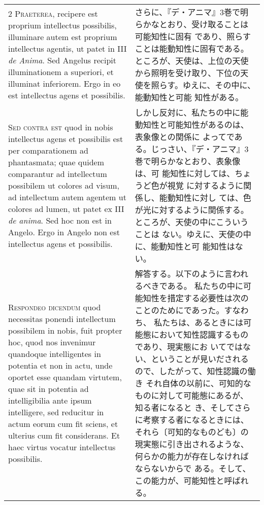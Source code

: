 \documentclass[10pt]{jsarticle} %
\begin{document}
\begin{longtable}{p{21em}p{21em}}
\\


2 {\scshape  Praeterea}, recipere est proprium
intellectus possibilis, illuminare autem est proprium intellectus
agentis, ut patet in III {\itshape de Anima}. Sed Angelus recipit illuminationem a
superiori, et illuminat inferiorem. Ergo in eo est intellectus agens et
possibilis.

&

さらに、『デ・アニマ』3巻で明らかなとおり、受け取ることは可能知性に固有
 であり、照らすことは能動知性に固有である。ところが、天使は、上位の天使
 から照明を受け取り、下位の天使を照らす。ゆえに、その中に、能動知性と可能
 知性がある。

\\


{\scshape  Sed contra est} quod in nobis intellectus
agens et possibilis est per comparationem ad phantasmata; quae quidem
comparantur ad intellectum possibilem ut colores ad visum, ad
intellectum autem agentem ut colores ad lumen, ut patet ex III {\itshape de
anima}. Sed hoc non est in Angelo. Ergo in Angelo non est intellectus
agens et possibilis.

&

しかし反対に、私たちの中に能動知性と可能知性があるのは、表象像との関係に
 よってである。じっさい、『デ・アニマ』3巻で明らかなとおり、表象像は、可
 能知性に対しては、ちょうど色が視覚 に対するように関係し、能動知性に対し
 ては、色が光に対するように関係する。ところが、天使の中にこういうことは
 ない。ゆえに、天使の中に、能動知性と可 能知性はない。


\\


{\scshape Respondeo dicendum} quod necessitas ponendi intellectum
possibilem in nobis, fuit propter hoc, quod nos invenimur quandoque
intelligentes in potentia et non in actu, unde oportet esse quandam
virtutem, quae sit in potentia ad intelligibilia ante ipsum intelligere,
sed reducitur in actum eorum cum fit sciens, et ulterius cum fit
considerans. Et haec virtus vocatur intellectus possibilis. 

&

解答する。以下のように言われるべきである。
私たちの中に可能知性を措定する必要性は次のことのためにであった。すなわち、
 私たちは、あるときには可能態において知性認識するものであり、現実態にお
 いてではない、ということが見いだされるので、したがって、知性認識の働き
 それ自体の以前に、可知的なものに対して可能態にあるが、知る者になると
 き、そしてさらに考察する者になるときには、それら〔可知的なものども〕の
 現実態に引き出されるような、何らかの能力が存在しなければならないからで
 ある。そして、この能力が、可能知性と呼ばれる。




\end{longtable}
\end{document}
